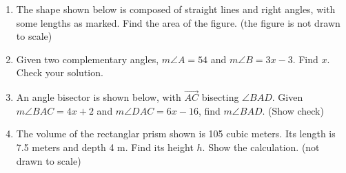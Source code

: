 \documentclass[12pt, twoside]{article}
\begin{document}
\begin{enumerate}
\item The shape shown below is composed of straight lines and right angles, with some lengths as marked. Find the area of the figure. (the figure is not drawn to scale)
  \begin{flushleft}
  \end{flushleft} \vspace{2cm}

\item Given two complementary angles, $m\angle A = 54$ and $m\angle B = 3x-3$. Find $x$. Check your solution. \vspace{3.5cm} 
 
\newpage

\item An angle bisector is shown below, with $\overrightarrow{AC}$ bisecting $\angle BAD$. Given $m\angle BAC = 4x+2$ and $m\angle DAC = 6x-16$, find $m\angle BAD$. (Show check)
  \begin{flushright}
  \end{flushright} \vspace{2cm}

\item The volume of the rectanglar prism shown is 105 cubic meters. Its length is 7.5 meters and depth 4 m. Find its height $h$. Show the calculation. (not drawn to scale)
\begin{flushright}
  \end{flushright} \vspace{1cm} 


\end{enumerate}
\end{document}
